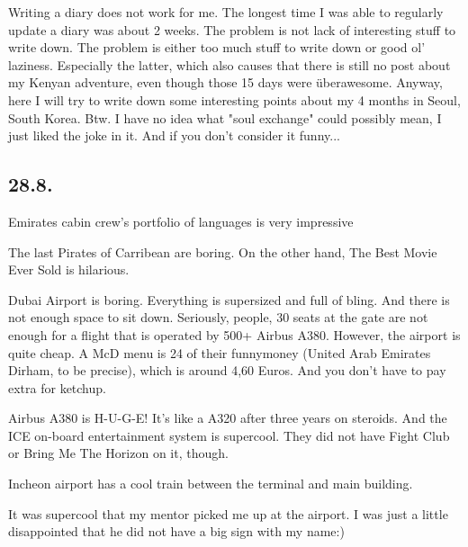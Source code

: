 \begin{post}
	\begin{content}
Writing a diary does not work for me. The longest time I was able to regularly update a diary was about 2 weeks. The problem is not lack of interesting stuff to write down. The problem is either too much stuff to write down or good ol' laziness. Especially the latter, which also causes that there is still no post about my Kenyan adventure, even though those 15 days were überawesome. Anyway, here I will try to write down some interesting points about my 4 months in Seoul, South Korea. Btw. I have no idea what "soul exchange" could possibly mean, I just liked the joke in it. And if you don't consider it funny...

\subsection{28.8.}

\begin{itemize*}

	\item Emirates cabin crew's portfolio of languages is very impressive

	\item The last Pirates of Carribean are boring. On the other hand, The Best Movie Ever Sold is hilarious.

	\item Dubai Airport is boring. Everything is supersized and full of bling. And there is not enough space to sit down. Seriously, people, 30 seats at the gate are not enough for a flight that is operated by 500+ Airbus A380. However, the airport is quite cheap. A McD menu is 24 of their funnymoney (United Arab Emirates Dirham, to be precise), which is around 4,60 Euros. And you don't have to pay extra for ketchup.

	\item Airbus A380 is H-U-G-E! It's like a A320 after three years on steroids. And the ICE on-board entertainment system is supercool. They did not have Fight Club or Bring Me The Horizon on it, though.

	\item Incheon airport has a cool train between the terminal and main building.

	\item It was supercool that my mentor picked me up at the airport. I was just a little disappointed that he did not have a big sign with my name:)


\end{itemize*}
\end{content}
\end{post}
